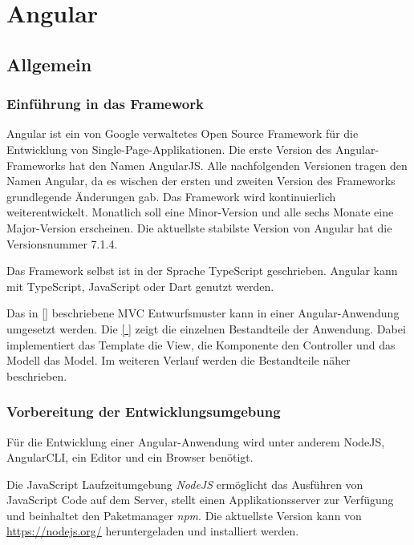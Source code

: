 
\chapter{Angular}

\section{Allgemein}

\subsection{Einführung in das Framework}
Angular ist ein von Google verwaltetes Open Source Framework für die Entwicklung von Single-Page-Applikationen. Die erste Version des Angular-Frameworks hat den Namen AngularJS. Alle nachfolgenden Versionen tragen den Namen Angular, da es wischen der ersten und zweiten Version des Frameworks grundlegende Änderungen gab. Das Framework wird kontinuierlich weiterentwickelt. Monatlich soll eine Minor-Version und alle sechs Monate eine Major-Version erscheinen. Die aktuellste stabilste Version von Angular hat die Versionsnummer 7.1.4. \autocites[vgl.][vii\psqq]{Woiwode.2018}[vgl.][3\psqq]{Freeman.2018}

Das Framework selbst ist in der Sprache TypeScript geschrieben. Angular kann mit TypeScript, JavaScript oder Dart genutzt werden. \autocites[vgl.][vii\psq]{Woiwode.2018}[vgl.][13]{Steyer.2017}

Das in \autoref{} beschriebene MVC Entwurfsmuster kann in einer Angular-Anwendung umgesetzt werden. Die \autoref{ } zeigt die einzelnen Bestandteile der Anwendung. Dabei implementiert das Template die View, die Komponente den Controller und das Modell das Model. \autocite[vgl.][34\psqq]{Freeman.2018} Im weiteren Verlauf werden die Bestandteile näher beschrieben. 



\subsection{Vorbereitung der Entwicklungsumgebung}
Für die Entwicklung einer Angular-Anwendung wird unter anderem NodeJS, AngularCLI, ein Editor und ein Browser benötigt.  

Die JavaScript Laufzeitumgebung \textit{NodeJS} ermöglicht das Ausführen von JavaScript Code auf dem Server, stellt einen Applikationsserver zur Verfügung und beinhaltet den Paketmanager \textit{npm}. Die aktuellste Version kann von \url{https://nodejs.org/} heruntergeladen und installiert werden. \autocites[vgl.][2\psqq]{Steyer.2017}[vgl.][7\psq]{Freeman.2018}    

